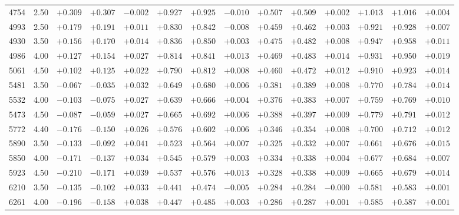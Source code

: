 \documentclass[]{aa}
\begin{document}
\begin{appendix}
\begin{table*}
\begin{center}
\begin{tabular}{llllllllllllll}
4754  &2.50 &$ +0.309$ &$ +0.307$ &$ -0.002$ &$ +0.927$ &$ +0.925$ &$ -0.010$ &$ +0.507$ &$ +0.509$ &$ +0.002$ &$ +1.013$ &$ +1.016$ &$ +0.004$\\
4993  &2.50 &$ +0.179$ &$ +0.191$ &$ +0.011$ &$ +0.830$ &$ +0.842$ &$ -0.008$ &$ +0.459$ &$ +0.462$ &$ +0.003$ &$ +0.921$ &$ +0.928$ &$ +0.007$\\
4930  &3.50 &$ +0.156$ &$ +0.170$ &$ +0.014$ &$ +0.836$ &$ +0.850$ &$ +0.003$ &$ +0.475$ &$ +0.482$ &$ +0.008$ &$ +0.947$ &$ +0.958$ &$ +0.011$\\
4986  &4.00 &$ +0.127$ &$ +0.154$ &$ +0.027$ &$ +0.814$ &$ +0.841$ &$ +0.013$ &$ +0.469$ &$ +0.483$ &$ +0.014$ &$ +0.931$ &$ +0.950$ &$ +0.019$\\
5061  &4.50 &$ +0.102$ &$ +0.125$ &$ +0.022$ &$ +0.790$ &$ +0.812$ &$ +0.008$ &$ +0.460$ &$ +0.472$ &$ +0.012$ &$ +0.910$ &$ +0.923$ &$ +0.014$\\
5481  &3.50 &$ -0.067$ &$ -0.035$ &$ +0.032$ &$ +0.649$ &$ +0.680$ &$ +0.006$ &$ +0.381$ &$ +0.389$ &$ +0.008$ &$ +0.770$ &$ +0.784$ &$ +0.014$\\
5532  &4.00 &$ -0.103$ &$ -0.075$ &$ +0.027$ &$ +0.639$ &$ +0.666$ &$ +0.004$ &$ +0.376$ &$ +0.383$ &$ +0.007$ &$ +0.759$ &$ +0.769$ &$ +0.010$\\
5473  &4.50 &$ -0.087$ &$ -0.059$ &$ +0.027$ &$ +0.665$ &$ +0.692$ &$ +0.006$ &$ +0.388$ &$ +0.397$ &$ +0.009$ &$ +0.779$ &$ +0.791$ &$ +0.012$\\
5772  &4.40 &$ -0.176$ &$ -0.150$ &$ +0.026$ &$ +0.576$ &$ +0.602$ &$ +0.006$ &$ +0.346$ &$ +0.354$ &$ +0.008$ &$ +0.700$ &$ +0.712$ &$ +0.012$\\
5890  &3.50 &$ -0.133$ &$ -0.092$ &$ +0.041$ &$ +0.523$ &$ +0.564$ &$ +0.007$ &$ +0.325$ &$ +0.332$ &$ +0.007$ &$ +0.661$ &$ +0.676$ &$ +0.015$\\
5850  &4.00 &$ -0.171$ &$ -0.137$ &$ +0.034$ &$ +0.545$ &$ +0.579$ &$ +0.003$ &$ +0.334$ &$ +0.338$ &$ +0.004$ &$ +0.677$ &$ +0.684$ &$ +0.007$\\
5923  &4.50 &$ -0.210$ &$ -0.171$ &$ +0.039$ &$ +0.537$ &$ +0.576$ &$ +0.013$ &$ +0.328$ &$ +0.338$ &$ +0.009$ &$ +0.665$ &$ +0.679$ &$ +0.014$\\
6210  &3.50 &$ -0.135$ &$ -0.102$ &$ +0.033$ &$ +0.441$ &$ +0.474$ &$ -0.005$ &$ +0.284$ &$ +0.284$ &$ -0.000$ &$ +0.581$ &$ +0.583$ &$ +0.001$\\
6261  &4.00 &$ -0.196$ &$ -0.158$ &$ +0.038$ &$ +0.447$ &$ +0.485$ &$ +0.003$ &$ +0.286$ &$ +0.287$ &$ +0.001$ &$ +0.585$ &$ +0.587$ &$ +0.001$\\

\end{tabular}
\end{center}
\end{table*}
\end{appendix}
\end{document}
